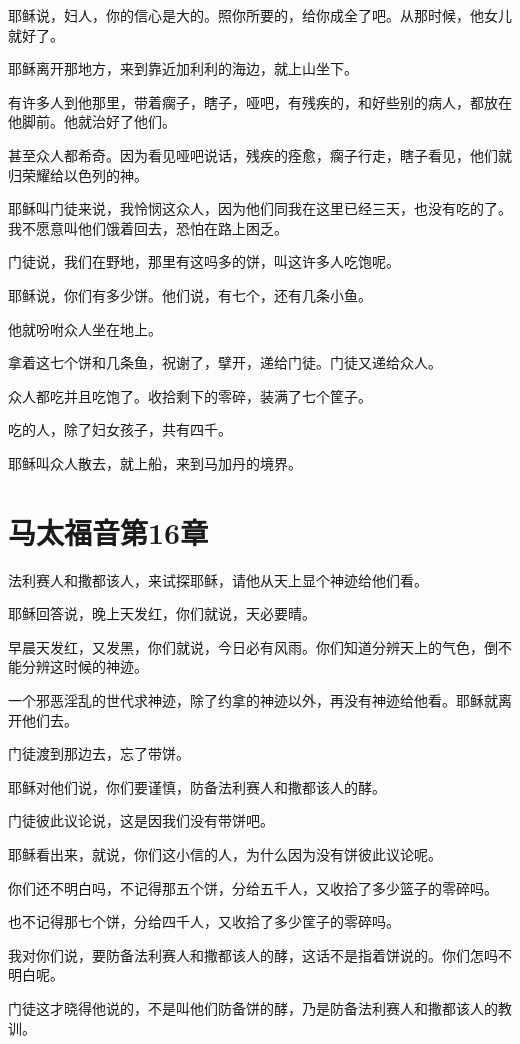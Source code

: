 \documentclass[12pt,oneside]{book}
\begin{document}
耶稣说，妇人，你的信心是大的。照你所要的，给你成全了吧。从那时候，他女儿就好了。

耶稣离开那地方，来到靠近加利利的海边，就上山坐下。

有许多人到他那里，带着瘸子，瞎子，哑吧，有残疾的，和好些别的病人，都放在他脚前。他就治好了他们。

甚至众人都希奇。因为看见哑吧说话，残疾的痊愈，瘸子行走，瞎子看见，他们就归荣耀给以色列的神。

耶稣叫门徒来说，我怜悯这众人，因为他们同我在这里已经三天，也没有吃的了。我不愿意叫他们饿着回去，恐怕在路上困乏。

门徒说，我们在野地，那里有这吗多的饼，叫这许多人吃饱呢。

耶稣说，你们有多少饼。他们说，有七个，还有几条小鱼。

他就吩咐众人坐在地上。

拿着这七个饼和几条鱼，祝谢了，擘开，递给门徒。门徒又递给众人。

众人都吃并且吃饱了。收拾剩下的零碎，装满了七个筐子。

吃的人，除了妇女孩子，共有四千。

耶稣叫众人散去，就上船，来到马加丹的境界。

\chapter{马太福音第16章}
法利赛人和撒都该人，来试探耶稣，请他从天上显个神迹给他们看。

耶稣回答说，晚上天发红，你们就说，天必要晴。

早晨天发红，又发黑，你们就说，今日必有风雨。你们知道分辨天上的气色，倒不能分辨这时候的神迹。

一个邪恶淫乱的世代求神迹，除了约拿的神迹以外，再没有神迹给他看。耶稣就离开他们去。

门徒渡到那边去，忘了带饼。

耶稣对他们说，你们要谨慎，防备法利赛人和撒都该人的酵。

门徒彼此议论说，这是因我们没有带饼吧。

耶稣看出来，就说，你们这小信的人，为什么因为没有饼彼此议论呢。

你们还不明白吗，不记得那五个饼，分给五千人，又收拾了多少篮子的零碎吗。

也不记得那七个饼，分给四千人，又收拾了多少筐子的零碎吗。

我对你们说，要防备法利赛人和撒都该人的酵，这话不是指着饼说的。你们怎吗不明白呢。

门徒这才晓得他说的，不是叫他们防备饼的酵，乃是防备法利赛人和撒都该人的教训。
\end{document}
